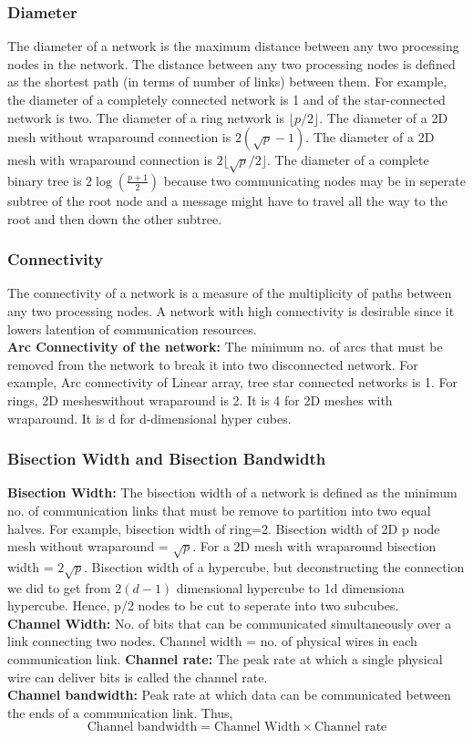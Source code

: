 \documentclass[12pt]{article}
\begin{document}
\subsubsection{Diameter} 
The diameter of a network is the maximum distance between any two processing nodes in the network. The distance between 
any two processing nodes is defined as the shortest path (in terms of number of links) between them. 
For example, the diameter of a completely connected network is 1 and of the star-connected network is two. The diameter of 
a ring network is $\lfloor p/2 \rfloor$. The diameter of a 2D mesh without wraparound connection is $2(\sqrt{p}-1)$.
The diameter of a 2D mesh with wraparound connection is $2\lfloor\sqrt{p}/2\rfloor$.
The diameter of a complete binary tree is $2\log(\frac{p+1}{2})$ because two communicating nodes may be in seperate subtree of the root node and a message might have to travel
all the way to the root and then down the other subtree.

\subsubsection{Connectivity}
The connectivity of a network is a measure of the multiplicity of paths between any two processing nodes. A network with high connectivity is desirable since it lowers latention of communication resources.\\
\textbf{Arc Connectivity of the network: }The minimum no. of arcs that must be removed from the network to break it into two disconnected network. 
For example, Arc connectivity of Linear array, tree star connected networks is 1. 
For rings, 2D mesheswithout wraparound is 2. It is 4 for 2D meshes with wraparound. It is d for d-dimensional hyper cubes.

\subsubsection{Bisection Width and Bisection Bandwidth}
\textbf{Bisection Width: }The bisection width of a network is defined as the minimum no. of communication links that must be remove to partition into
two equal halves. For example, bisection width of ring=2. Bisection width of 2D p node mesh without wraparound = $\sqrt{p}$. For a 2D mesh with wraparound bisection 
width = $2\sqrt{p}$. Bisection width of a hypercube, but deconstructing the connection we did to get from $2(d-1)$ dimensional hypercube to 1d dimensiona hypercube. Hence, 
p/2 nodes to be cut to seperate into two subcubes.\\
\textbf{Channel Width: } No. of bits that can be communicated simultaneously over a link connecting two nodes. Channel width = no. of physical wires in each communication link.
\textbf{Channel rate: }The peak rate at which a single physical wire can deliver bits is called the channel rate.\\
\textbf{Channel bandwidth: }Peak rate at which data can be communicated between the ends of a communication link.
Thus, 
\begin{equation}
    \text{Channel bandwidth} = \text{Channel Width} \times \text{Channel rate}
\end{equation}
\end{document}
